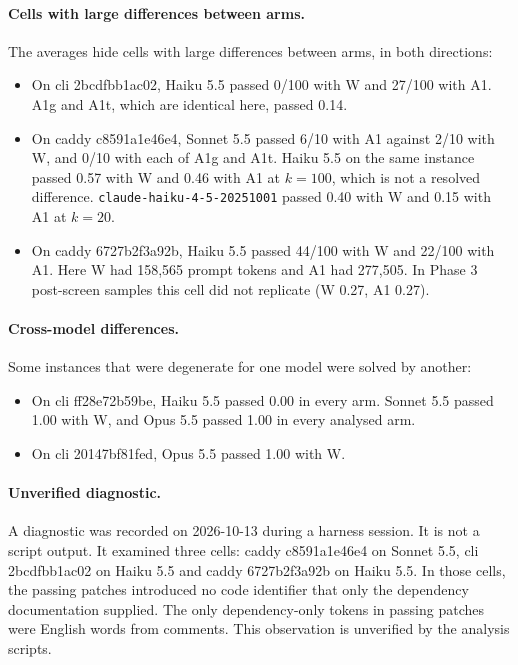 \documentclass[10pt]{article}
\begin{document}
\paragraph{Cells with large differences between arms.} The averages hide cells with large differences between arms, in both directions:
\begin{itemize}
\item On cli 2bcdfbb1ac02, Haiku 5.5 passed 0/100 with W and 27/100 with A1. A1g and A1t, which are identical here, passed 0.14.
\item On caddy c8591a1e46e4, Sonnet 5.5 passed 6/10 with A1 against 2/10 with W, and 0/10 with each of A1g and A1t. Haiku 5.5 on the same instance passed 0.57 with W and 0.46 with A1 at $k=100$, which is not a resolved difference. \texttt{claude-haiku-4-5-20251001} passed 0.40 with W and 0.15 with A1 at $k=20$.
\item On caddy 6727b2f3a92b, Haiku 5.5 passed 44/100 with W and 22/100 with A1. Here W had 158,565 prompt tokens and A1 had 277,505. In Phase 3 post-screen samples this cell did not replicate (W 0.27, A1 0.27).
\end{itemize}

\paragraph{Cross-model differences.} Some instances that were degenerate for one model were solved by another:
\begin{itemize}
\item On cli ff28e72b59be, Haiku 5.5 passed 0.00 in every arm. Sonnet 5.5 passed 1.00 with W, and Opus 5.5 passed 1.00 in every analysed arm.
\item On cli 20147bf81fed, Opus 5.5 passed 1.00 with W.
\end{itemize}

\paragraph{Unverified diagnostic.} A diagnostic was recorded on 2026-10-13 during a harness session. It is not a script output. It examined three cells: caddy c8591a1e46e4 on Sonnet 5.5, cli 2bcdfbb1ac02 on Haiku 5.5 and caddy 6727b2f3a92b on Haiku 5.5. In those cells, the passing patches introduced no code identifier that only the dependency documentation supplied. The only dependency-only tokens in passing patches were English words from comments. This observation is unverified by the analysis scripts.
\end{document}
